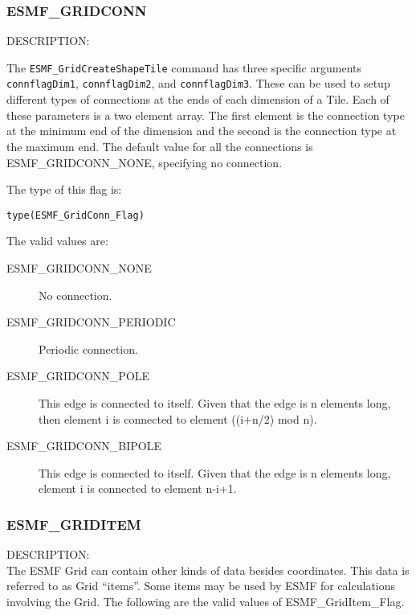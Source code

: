 
\subsubsection{ESMF\_GRIDCONN}
\label{const:gridconn}

{\sf DESCRIPTION:\\}
\begin{sloppypar}
The {\tt ESMF\_GridCreateShapeTile} command has three specific arguments
{\tt connflagDim1}, {\tt connflagDim2}, and {\tt connflagDim3}. These can be used
to setup different types of connections at the ends of each dimension
of a Tile.  Each of these parameters is a two element array. The first
element is the connection type at the minimum end of the dimension
and the second is the connection type at the maximum end. The default
value for all the connections is ESMF\_GRIDCONN\_NONE, specifying no
connection.
\end{sloppypar}

The type of this flag is:

{\tt type(ESMF\_GridConn\_Flag)}

The valid values are:
\begin{description}
\item [ESMF\_GRIDCONN\_NONE] No connection.

\item [ESMF\_GRIDCONN\_PERIODIC] Periodic connection.

\item [ESMF\_GRIDCONN\_POLE] This edge is connected to itself. Given
that the edge is n elements long, then element i is connected to
element ((i+n/2) mod n).

\item [ESMF\_GRIDCONN\_BIPOLE] This edge is connected to itself. Given
that the edge is n elements long, element i is connected to element n-i+1.
\end{description}


\subsubsection{ESMF\_GRIDITEM}
\label{const:griditem}

{\sf DESCRIPTION:\\}
The ESMF Grid can contain other kinds of data besides coordinates. 
This data is referred to as Grid ``items''. Some items may be used
by ESMF for calculations involving the Grid. The following
are the valid values of ESMF\_GridItem\_Flag.

